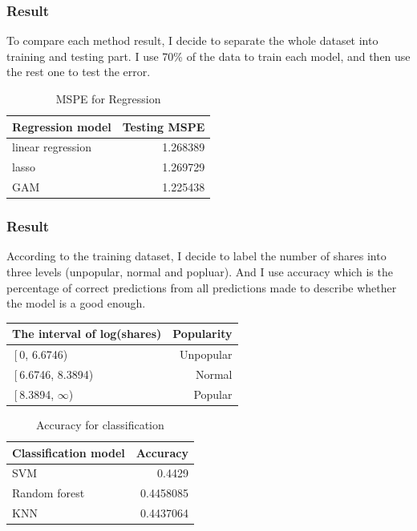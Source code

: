 \documentclass{beamer}
\begin{document}

\begin{frame}
\frametitle{Result}
To compare each method result, I decide to separate the whole dataset into training and testing part. I use 70\% of the data to train each model, and then use the rest one to test the error.

    \begin{table}[h]
        \centering
        \caption{MSPE for Regression}
        \begin{tabular}{ l | r }
            \hline\hline
            Regression model & Testing MSPE\\
            \hline
            linear regression & 1.268389 \\
            lasso & 1.269729 \\
            GAM & 1.225438 \\
            \hline\hline
        \end{tabular}
        \label{table:1}
    \end{table}
    
\end{frame}


\begin{frame}
\frametitle{Result}
According to the training dataset, I decide to label the number of shares into three levels (unpopular, normal and popluar). And I use accuracy which is the percentage of correct predictions from all predictions made to describe whether the model is a good enough.

    \begin{table}[h]
        \centering
        \begin{tabular}{ l | r }
            \hline\hline
            The interval of log(shares) & Popularity\\
            \hline
            $\left[$0, 6.6746) & Unpopular \\
            $\left[$6.6746, 8.3894) & Normal \\
            $\left[$8.3894, $\infty$) & Popular \\
            \hline\hline
        \end{tabular}
    \end{table}
    
        \begin{table}[h]
        \centering
        \caption{Accuracy for classification}
        \begin{tabular}{ l | r }
            \hline\hline
            Classification model & Accuracy\\
            \hline
            SVM & 0.4429 \\
            Random forest & 0.4458085 \\
            KNN & 0.4437064 \\
            \hline\hline
        \end{tabular}
        \label{table:1}
    \end{table}
    
\end{frame}
\end{document}
